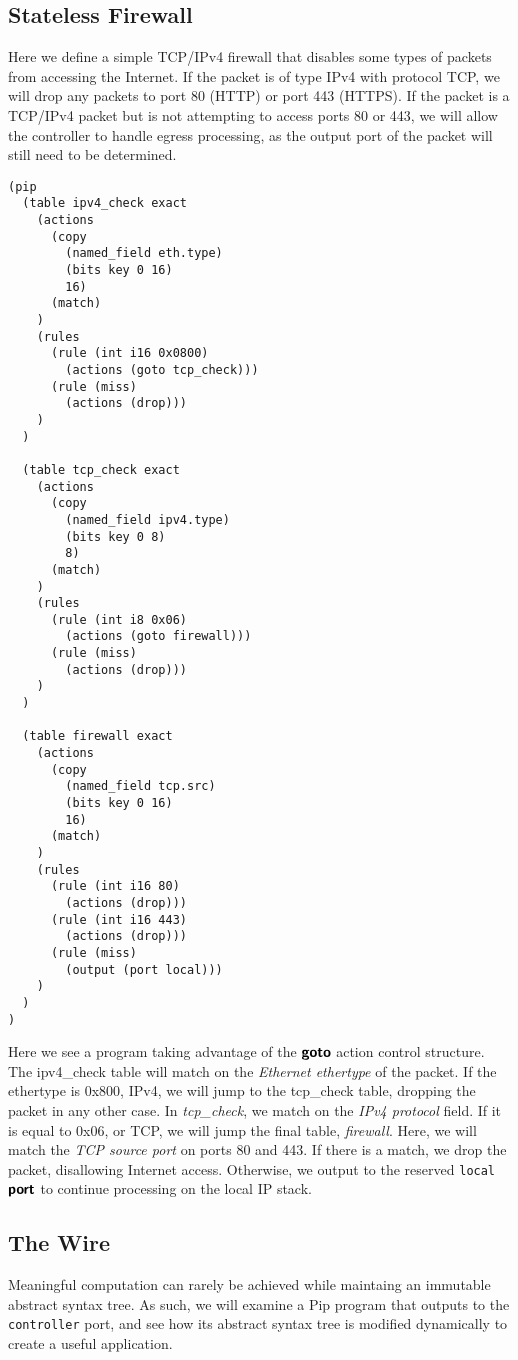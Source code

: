 \subsection{Stateless Firewall}
Here we define a simple TCP/IPv4 firewall that disables some types of packets from accessing the Internet. If the packet is of type IPv4 with protocol TCP, we will drop any packets to port 80 (HTTP) or port 443 (HTTPS). If the packet is a TCP/IPv4 packet but is not attempting to access ports 80 or 443, we will allow the controller to handle egress processing, as the output port of the packet will still need to be determined.
\begin{lstlisting}
(pip
  (table ipv4_check exact
    (actions
      (copy 
        (named_field eth.type)
        (bits key 0 16)
        16)
      (match)
    )
    (rules
      (rule (int i16 0x0800)
        (actions (goto tcp_check)))
      (rule (miss)
        (actions (drop)))
    )
  )

  (table tcp_check exact
    (actions
      (copy 
        (named_field ipv4.type)
        (bits key 0 8)
        8)
      (match)
    )
    (rules
      (rule (int i8 0x06)
        (actions (goto firewall)))
      (rule (miss)
        (actions (drop)))
    )
  )

  (table firewall exact
    (actions
      (copy
        (named_field tcp.src)
        (bits key 0 16)
        16)
      (match)
    )
    (rules
      (rule (int i16 80)
        (actions (drop)))
      (rule (int i16 443)
        (actions (drop)))
      (rule (miss)
        (output (port local)))
    )
  )
)
\end{lstlisting}

Here we see a program taking advantage of the $\bm{\mathsf{{goto}}}$ action control structure. The ipv4\_check table will match on the \textit{Ethernet ethertype} of the packet. If the ethertype is 0x800, IPv4, we will jump to the tcp\_check table, dropping the packet in any other case. In \textit{tcp\_check}, we match on the \textit{IPv4 protocol} field. If it is equal to 0x06, or TCP, we will jump the final table, \textit{firewall}. Here, we will match the \textit{TCP source port} on ports 80 and 443. If there is a match, we drop the packet, disallowing Internet access. Otherwise, we output to the reserved \texttt{local} $\bm{\mathsf{{port}}}$ to continue processing on the local IP stack.

\subsection{The Wire}
Meaningful computation can rarely be achieved while maintaing an immutable abstract syntax tree. As such, we will examine a Pip program that outputs to the \texttt{controller} port, and see how its abstract syntax tree is modified dynamically to create a useful application.

